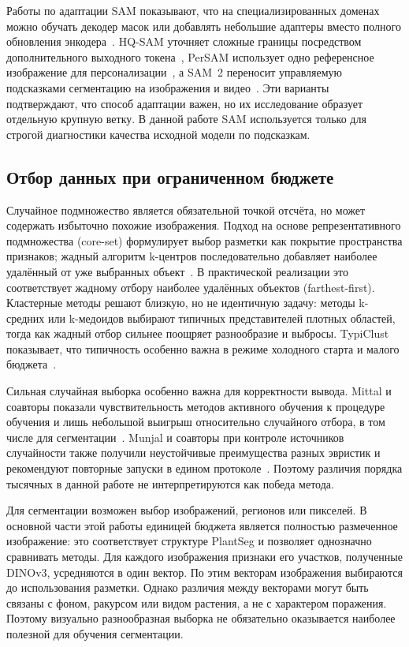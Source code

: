 \documentclass[a4paper,12pt]{extarticle}
\begin{document}
Работы по адаптации SAM показывают, что на специализированных доменах можно
обучать декодер масок или добавлять небольшие адаптеры вместо полного обновления
энкодера~\cite{samadapter,medsam}. HQ-SAM уточняет сложные границы посредством
дополнительного выходного токена~\cite{hqsam}, PerSAM использует одно
референсное изображение для персонализации~\cite{persam}, а SAM~2 переносит
управляемую подсказками сегментацию на изображения и видео~\cite{sam2}. Эти
варианты подтверждают, что способ адаптации важен, но их исследование образует
отдельную крупную ветку. В данной работе SAM используется только для строгой
диагностики качества исходной модели по подсказкам.

\subsection{Отбор данных при ограниченном бюджете}

Случайное подмножество является обязательной точкой отсчёта, но может содержать
избыточно похожие изображения. Подход на основе репрезентативного подмножества
(core-set) формулирует выбор разметки как покрытие пространства признаков;
жадный алгоритм k-центров последовательно
добавляет наиболее удалённый от уже выбранных объект~\cite{coreset}. В
практической реализации это соответствует жадному отбору наиболее удалённых
объектов (farthest-first). Кластерные
методы решают близкую, но не идентичную задачу: методы k-средних или k-медоидов выбирают
типичных представителей плотных областей, тогда как жадный отбор сильнее
поощряет разнообразие и выбросы. TypiClust показывает, что типичность особенно
важна в режиме холодного старта и малого бюджета~\cite{typiclust}.

Сильная случайная выборка особенно важна для корректности вывода. Mittal и
соавторы показали чувствительность методов активного обучения к процедуре
обучения и лишь небольшой выигрыш относительно случайного отбора, в том числе
для сегментации~\cite{mittal2019}. Munjal и соавторы при контроле источников
случайности также получили неустойчивые преимущества разных эвристик и
рекомендуют повторные запуски в едином протоколе~\cite{munjal2022}. Поэтому
различия порядка тысячных в данной работе не интерпретируются как победа метода.

Для сегментации возможен выбор изображений, регионов или пикселей. В основной
части этой работы единицей бюджета является полностью размеченное изображение:
это соответствует структуре PlantSeg и позволяет однозначно сравнивать методы.
Для каждого изображения признаки его участков, полученные DINOv3, усредняются
в один вектор. По этим векторам изображения выбираются до использования
разметки. Однако различия между векторами могут быть связаны с фоном, ракурсом
или видом растения, а не с характером поражения. Поэтому визуально
разнообразная выборка не обязательно оказывается наиболее полезной для
обучения сегментации.
\end{document}
